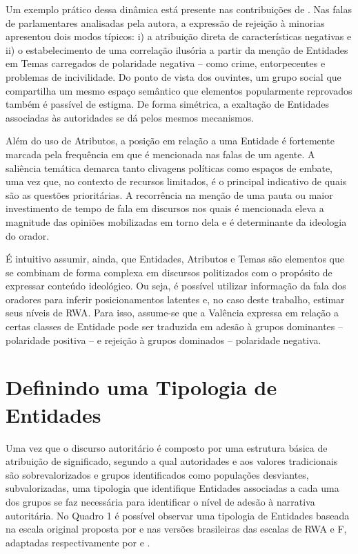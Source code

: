 \documentclass[
12pt,				%
openright,			%
twoside,			%
a4paper,			%
english,			%
french,				%
spanish,			%
brazil				%
]{abntex2}
\begin{document}
Um exemplo prático dessa dinâmica está presente nas contribuições de . Nas falas de parlamentares analisadas pela autora, a expressão de rejeição à minorias apresentou dois modos típicos: i) a atribuição direta de características negativas e ii) o estabelecimento de uma correlação ilusória a partir da menção de Entidades em Temas carregados de polaridade negativa -- como crime, entorpecentes e problemas de incivilidade. Do ponto de vista dos ouvintes, um grupo social que compartilha um mesmo espaço semântico que elementos popularmente reprovados também é passível de estigma. De forma simétrica, a exaltação de Entidades associadas às autoridades se dá pelos mesmos mecanismos.

Além do uso de Atributos, a posição em relação a uma Entidade é fortemente marcada pela frequência em que é mencionada nas falas de um agente. A saliência temática demarca tanto clivagens políticas como espaços de embate, uma vez que, no contexto de recursos limitados, é o principal indicativo de quais são as questões prioritárias. A recorrência na menção de uma pauta ou maior investimento de tempo de fala em discursos nos quais é mencionada eleva a magnitude das opiniões mobilizadas em torno dela e é determinante da ideologia do orador.

É intuitivo assumir, ainda, que Entidades, Atributos e Temas são elementos que se combinam de forma complexa em discursos politizados com o propósito de expressar conteúdo ideológico. Ou seja, é possível utilizar informação da fala dos oradores para inferir posicionamentos latentes e, no caso deste trabalho, estimar seus níveis de RWA. Para isso, assume-se que a Valência expressa em relação a certas classes de Entidade pode ser traduzida em adesão à grupos dominantes -- polaridade positiva -- e rejeição à grupos dominados -- polaridade negativa.

\section{Definindo uma Tipologia de Entidades}

Uma vez que o discurso autoritário é composto por uma estrutura básica de atribuição de significado, segundo a qual autoridades e aos valores tradicionais são sobrevalorizados e grupos identificados como populações desviantes, subvalorizadas, uma tipologia que identifique Entidades associadas a cada uma dos grupos se faz necessária para identificar o nível de adesão à narrativa autoritária. No Quadro 1 é possível observar uma tipologia de Entidades baseada na escala original proposta por  e nas versões brasileiras das escalas de RWA e F, adaptadas respectivamente por  e . 
\end{document}
